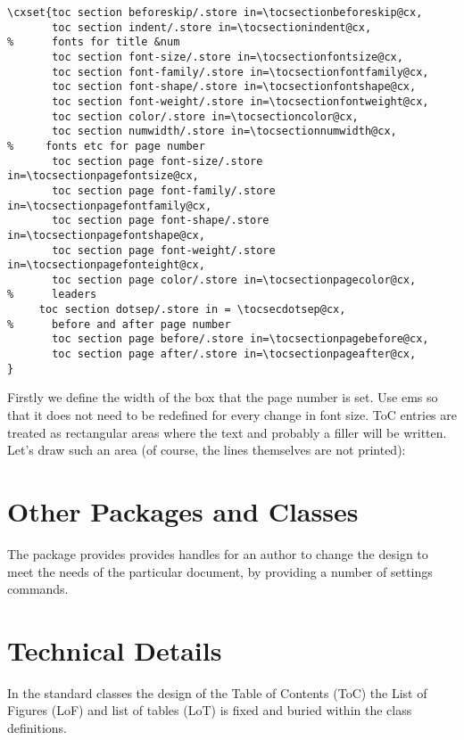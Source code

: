 \begin{verbatim}
\cxset{toc section beforeskip/.store in=\tocsectionbeforeskip@cx,
       toc section indent/.store in=\tocsectionindent@cx,
%      fonts for title &num
       toc section font-size/.store in=\tocsectionfontsize@cx, 
       toc section font-family/.store in=\tocsectionfontfamily@cx, 
       toc section font-shape/.store in=\tocsectionfontshape@cx, 
       toc section font-weight/.store in=\tocsectionfontweight@cx, 
       toc section color/.store in=\tocsectioncolor@cx,
       toc section numwidth/.store in=\tocsectionnumwidth@cx,
%	  fonts etc for page number
       toc section page font-size/.store in=\tocsectionpagefontsize@cx,
       toc section page font-family/.store in=\tocsectionpagefontfamily@cx,
       toc section page font-shape/.store in=\tocsectionpagefontshape@cx,
       toc section page font-weight/.store in=\tocsectionpagefonteight@cx,
       toc section page color/.store in=\tocsectionpagecolor@cx,
%      leaders
	 toc section dotsep/.store in = \tocsecdotsep@cx,
%      before and after page number
       toc section page before/.store in=\tocsectionpagebefore@cx,
       toc section page after/.store in=\tocsectionpageafter@cx,
}
\end{verbatim}

Firstly we define the width of the box that the page number is set. Use ems so that it does not need to be redefined for every change in font size.
ToC entries are treated as rectangular areas where the text
and probably a filler will be written. Let's draw such an
area (of course, the lines themselves are not printed):



\section{Other Packages and Classes}
The package  provides  provides handles for an author to change the design to meet the needs of the particular document, by providing a number of settings commands.



\section{Technical Details}

In the standard classes the design of the Table of Contents (ToC) the List of Figures (LoF) and list of tables (LoT) is fixed and buried within the class definitions.

